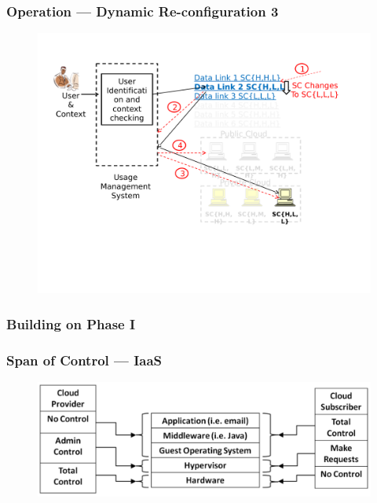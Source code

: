 \documentclass[t,handout]{beamer}
\begin{document}
\begin{frame}
\frametitle{Operation --- Dynamic Re-configuration 3}
\begin{figure}[!t]
\centering
\includegraphics[width=\textwidth]{7}
\end{figure}
\end{frame}

\begin{frame}
\frametitle{Building on Phase I}

\end{frame}

\begin{frame}
\frametitle{Span of Control --- IaaS}
\begin{figure}[!t]
\centering
\includegraphics[width=\textwidth]{8-crop}
\end{figure}
\end{frame}
\end{document}
